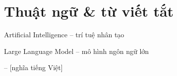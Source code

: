 \chapter*{Thuật ngữ \& từ viết tắt}
\vspace{1.0cm}
\begin{abbrv}
    \item[AI] Artificial Intelligence -- trí tuệ nhân tạo
    \item[LLM] Large Language Model -- mô hình ngôn ngữ lớn
    \item[{[VT]}] [Tên đầy đủ] -- [nghĩa tiếng Việt]
\end{abbrv}

